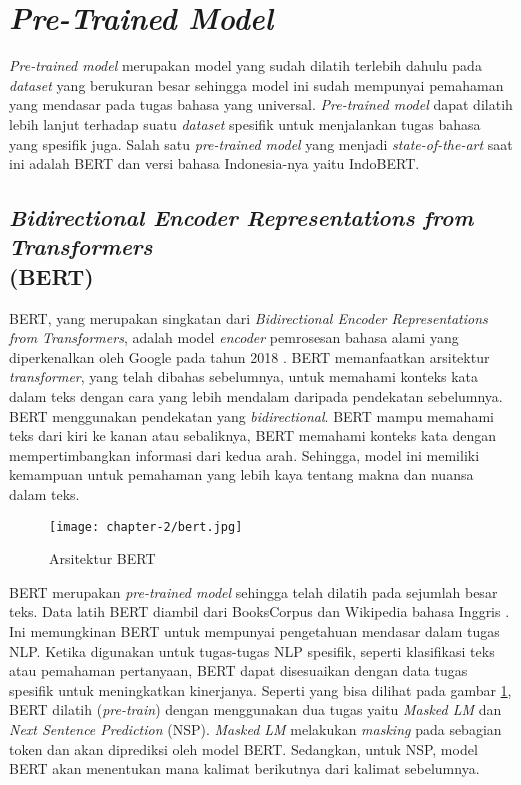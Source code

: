 \section{\textit{Pre-Trained Model}}

\textit{Pre-trained model} merupakan model yang sudah dilatih terlebih dahulu pada \textit{dataset} yang berukuran besar sehingga model ini sudah mempunyai pemahaman yang mendasar pada tugas bahasa yang universal. \textit{Pre-trained model} dapat dilatih lebih lanjut terhadap suatu \textit{dataset} spesifik untuk menjalankan tugas bahasa yang spesifik juga. Salah satu \textit{pre-trained model} yang menjadi \textit{state-of-the-art} saat ini adalah BERT dan versi bahasa Indonesia-nya yaitu IndoBERT. 

\subsection{\textit{Bidirectional Encoder Representations from Transformers} \\ (BERT)}

BERT, yang merupakan singkatan dari \textit{Bidirectional Encoder Representations from Transformers}, adalah model \textit{encoder} pemrosesan bahasa alami yang diperkenalkan oleh Google pada tahun 2018 \parencite{bert}. BERT memanfaatkan arsitektur \textit{transformer}, yang telah dibahas sebelumnya, untuk memahami konteks kata dalam teks dengan cara yang lebih mendalam daripada pendekatan sebelumnya. BERT menggunakan pendekatan yang \textit{bidirectional}. BERT mampu memahami teks dari kiri ke kanan atau sebaliknya, BERT memahami konteks kata dengan mempertimbangkan informasi dari kedua arah. Sehingga, model ini memiliki kemampuan untuk pemahaman yang lebih kaya tentang makna dan nuansa dalam teks.

\begin{figure}[ht]
    \vspace{0.25cm}
    \centering
    \texttt{[image: chapter-2/bert.jpg]}
    \caption{Arsitektur BERT \parencite{bert}}
    \label{fig:bert}
\end{figure}

BERT merupakan \textit{pre-trained model} sehingga telah dilatih pada sejumlah besar teks. Data latih BERT diambil dari BooksCorpus dan Wikipedia bahasa Inggris \parencite{bert}. Ini memungkinan BERT untuk mempunyai pengetahuan mendasar dalam tugas NLP. Ketika digunakan untuk tugas-tugas NLP spesifik, seperti klasifikasi teks atau pemahaman pertanyaan, BERT dapat disesuaikan dengan data tugas spesifik untuk meningkatkan kinerjanya. Seperti yang bisa dilihat pada gambar \ref{fig:bert}, BERT dilatih (\textit{pre-train}) dengan menggunakan dua tugas yaitu \textit{Masked LM} dan \textit{Next Sentence Prediction} (NSP). \textit{Masked LM} melakukan \textit{masking} pada sebagian token dan akan diprediksi oleh model BERT. Sedangkan, untuk NSP, model BERT akan menentukan mana kalimat berikutnya dari kalimat sebelumnya.

